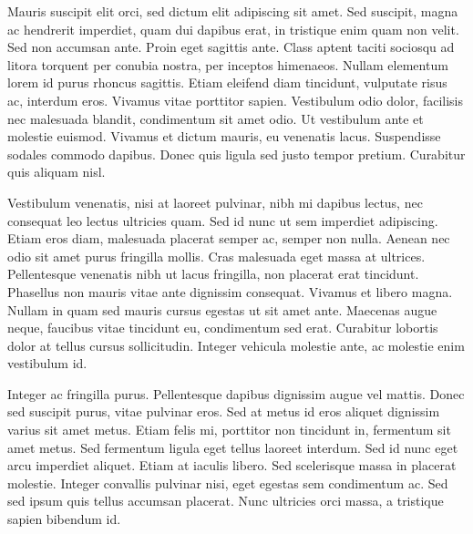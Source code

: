\documentclass[9pt]{memoir}
\begin{document}
Mauris suscipit elit orci, sed dictum elit adipiscing sit amet. Sed suscipit, magna ac hendrerit imperdiet, quam dui dapibus erat, in tristique enim quam non velit. Sed non accumsan ante. Proin eget sagittis ante. Class aptent taciti sociosqu ad litora torquent per conubia nostra, per inceptos himenaeos. Nullam elementum lorem id purus rhoncus sagittis. Etiam eleifend diam tincidunt, vulputate risus ac, interdum eros. Vivamus vitae porttitor sapien. Vestibulum odio dolor, facilisis nec malesuada blandit, condimentum sit amet odio. Ut vestibulum ante et molestie euismod. Vivamus et dictum mauris, eu venenatis lacus. Suspendisse sodales commodo dapibus. Donec quis ligula sed justo tempor pretium. Curabitur quis aliquam nisl.

Vestibulum venenatis, nisi at laoreet pulvinar, nibh mi dapibus lectus, nec consequat leo lectus ultricies quam. Sed id nunc ut sem imperdiet adipiscing. Etiam eros diam, malesuada placerat semper ac, semper non nulla. Aenean nec odio sit amet purus fringilla mollis. Cras malesuada eget massa at ultrices. Pellentesque venenatis nibh ut lacus fringilla, non placerat erat tincidunt. Phasellus non mauris vitae ante dignissim consequat. Vivamus et libero magna. Nullam in quam sed mauris cursus egestas ut sit amet ante. Maecenas augue neque, faucibus vitae tincidunt eu, condimentum sed erat. Curabitur lobortis dolor at tellus cursus sollicitudin. Integer vehicula molestie ante, ac molestie enim vestibulum id.

Integer ac fringilla purus. Pellentesque dapibus dignissim augue vel mattis. Donec sed suscipit purus, vitae pulvinar eros. Sed at metus id eros aliquet dignissim varius sit amet metus. Etiam felis mi, porttitor non tincidunt in, fermentum sit amet metus. Sed fermentum ligula eget tellus laoreet interdum. Sed id nunc eget arcu imperdiet aliquet. Etiam at iaculis libero. Sed scelerisque massa in placerat molestie. Integer convallis pulvinar nisi, eget egestas sem condimentum ac. Sed sed ipsum quis tellus accumsan placerat. Nunc ultricies orci massa, a tristique sapien bibendum id.
\end{document}
